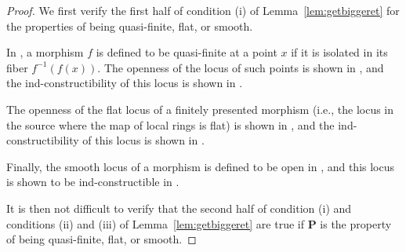 \documentclass[12pt]{article}
\theoremstyle{definition}
\numberwithin{equation}{subsection}
\begin{document}
\corniceprops
\begin{proof} 

We first verify the first half of condition (i) of Lemma~\ref{lem:getbiggeret} for the properties of being quasi-finite, flat, or smooth. 

In \cite[Section 6.2]{ega2}, a morphism $f$ is defined to be quasi-finite at a point $x$ if it is isolated in its fiber $f^{-1}(f(x))$. The openness of the locus of such points is shown in \cite[Corollary 13.1.4]{ega43}, and the ind-constructibility of this locus is shown in \cite[Proposition 9.3.2]{ega43}.

The openness of the flat locus of a finitely presented morphism (i.e., the locus in the source where the map of local rings is flat) is shown in \cite[Theorem 11.3.1]{ega43}, and the ind-constructibility of this locus is shown in \cite[Proposition 11.2.8]{ega43}.

Finally, the smooth locus of a morphism is defined to be open in \cite[Definition 17.3.7]{ega44}, and this locus is shown to be ind-constructible in \cite[Proposition 17.7.11]{ega44} .

It is then not difficult to verify that the second half of condition (i) and conditions (ii) and (iii) of Lemma~\ref{lem:getbiggeret} are true if $\mathbf{P}$ is the property of being quasi-finite, flat, or smooth.\end{proof}

\printbibliography 
\end{document}
